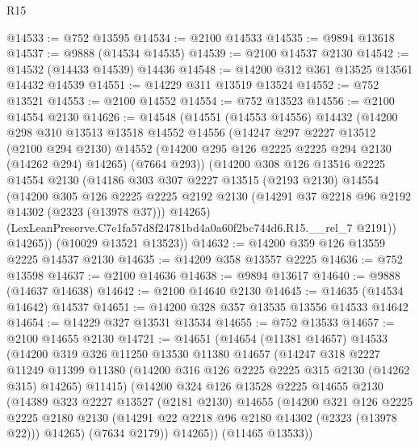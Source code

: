 \begin{lexlean}{R15}
\begin{coremodule}
@14533 := @752 @13595
@14534 := @2100 @14533
@14535 := @9894 @13618
@14537 := @9888 (@14534 @14535)
@14539 := @2100 @14537 @2130
@14542 := @14532 (@14433 @14539) @14436
@14548 := @14200 @312 @361 @13525 @13561 @14432 @14539
@14551 := @14229 @311 @13519 @13524
@14552 := @752 @13521
@14553 := @2100 @14552
@14554 := @752 @13523
@14556 := @2100 @14554 @2130
@14626 := @14548
    (@14551
      (@14553 @14556)
      @14432
      (@14200
        @298
        @310
        @13513
        @13518
        @14552
        @14556
        (@14247
          @297
          @2227
          @13512
          (@2100 @294 @2130)
          @14552
          (@14200 @295 @126 @2225 @2225 @294 @2130 (@14262 @294) @14265)
          (@7664 @293))
        (@14200
          @308
          @126
          @13516
          @2225
          @14554
          @2130
          (@14186
            @303
            @307
            @2227
            @13515
            (@2193 @2130)
            @14554
            (@14200
              @305
              @126
              @2225
              @2225
              @2192
              @2130
              (@14291 @37 @2218 @96 @2192 @14302 (@2323 (@13978 @37)))
              @14265)
            (LexLeanPreserve.C7e1fa57d8f24781bd4a0a60f2bc744d6.R15.__rel_7 @2191))
          @14265))
      (@10029 @13521 @13523))
@14632 := @14200 @359 @126 @13559 @2225 @14537 @2130
@14635 := @14209 @358 @13557 @2225
@14636 := @752 @13598
@14637 := @2100 @14636
@14638 := @9894 @13617
@14640 := @9888 (@14637 @14638)
@14642 := @2100 @14640 @2130
@14645 := @14635 (@14534 @14642) @14537
@14651 := @14200 @328 @357 @13535 @13556 @14533 @14642
@14654 := @14229 @327 @13531 @13534
@14655 := @752 @13533
@14657 := @2100 @14655 @2130
@14721 := @14651
    (@14654
      (@11381 @14657)
      @14533
      (@14200
        @319
        @326
        @11250
        @13530
        @11380
        @14657
        (@14247
          @318
          @2227
          @11249
          @11399
          @11380
          (@14200 @316 @126 @2225 @2225 @315 @2130 (@14262 @315) @14265)
          @11415)
        (@14200
          @324
          @126
          @13528
          @2225
          @14655
          @2130
          (@14389
            @323
            @2227
            @13527
            (@2181 @2130)
            @14655
            (@14200
              @321
              @126
              @2225
              @2225
              @2180
              @2130
              (@14291 @22 @2218 @96 @2180 @14302 (@2323 (@13978 @22)))
              @14265)
            (@7634 @2179))
          @14265))
      (@11465 @13533))

\end{coremodule}
\end{lexlean}
